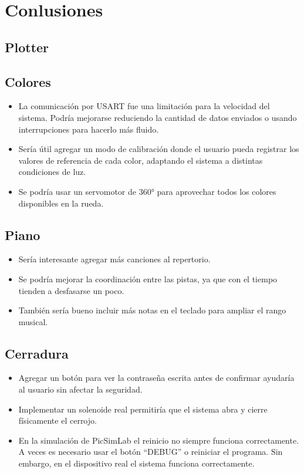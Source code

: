 \section{Conlusiones}

\subsection{Plotter}
\subsection{Colores}

\begin{itemize}
\item La comunicación por USART fue una limitación para la velocidad del sistema. Podría mejorarse reduciendo la cantidad de datos enviados o usando interrupciones para hacerlo más fluido.
\item Sería útil agregar un modo de calibración donde el usuario pueda registrar los valores de referencia de cada color, adaptando el sistema a distintas condiciones de luz.
\item Se podría usar un servomotor de 360° para aprovechar todos los colores disponibles en la rueda.
\end{itemize}

\subsection{Piano}

\begin{itemize}
\item Sería interesante agregar más canciones al repertorio.
\item Se podría mejorar la coordinación entre las pistas, ya que con el tiempo tienden a desfasarse un poco.
\item También sería bueno incluir más notas en el teclado para ampliar el rango musical.
\end{itemize}

\subsection{Cerradura}

\begin{itemize}
\item Agregar un botón para ver la contraseña escrita antes de confirmar ayudaría al usuario sin afectar la seguridad.
\item Implementar un solenoide real permitiría que el sistema abra y cierre físicamente el cerrojo.
\item En la simulación de PicSimLab el reinicio no siempre funciona correctamente. A veces es necesario usar el botón “DEBUG” o reiniciar el programa. Sin embargo, en el dispositivo real el sistema funciona correctamente.
\end{itemize}